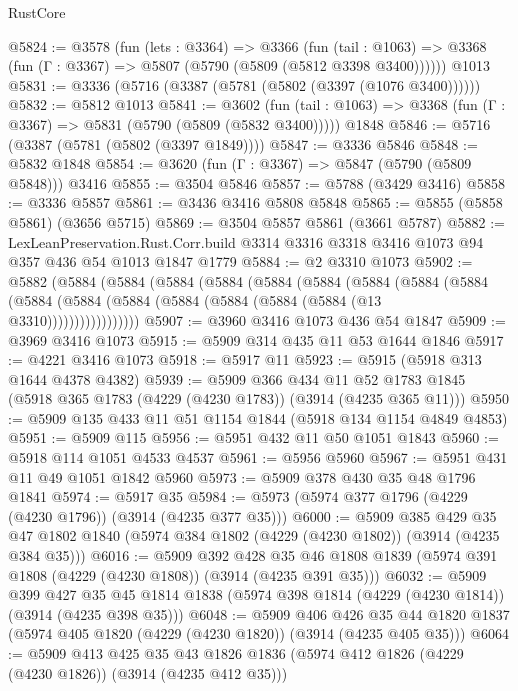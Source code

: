\begin{lexlean}{RustCore}
\begin{coremodule}
@5824 := @3578
    (fun (lets : @3364) =>
    @3366
      (fun (tail : @1063) => @3368 (fun (Γ : @3367) => @5807 (@5790 (@5809 (@5812 @3398 @3400))))))
    @1013
@5831 := @3336 (@5716 (@3387 (@5781 (@5802 (@3397 (@1076 @3400))))))
@5832 := @5812 @1013
@5841 := @3602
    (fun (tail : @1063) => @3368 (fun (Γ : @3367) => @5831 (@5790 (@5809 (@5832 @3400)))))
    @1848
@5846 := @5716 (@3387 (@5781 (@5802 (@3397 @1849))))
@5847 := @3336 @5846
@5848 := @5832 @1848
@5854 := @3620 (fun (Γ : @3367) => @5847 (@5790 (@5809 @5848))) @3416
@5855 := @3504 @5846
@5857 := @5788 (@3429 @3416)
@5858 := @3336 @5857
@5861 := @3436 @3416 @5808 @5848
@5865 := @5855 (@5858 @5861) (@3656 @5715)
@5869 := @3504 @5857 @5861 (@3661 @5787)
@5882 := LexLeanPreservation.Rust.Corr.build
    @3314
    @3316
    @3318
    @3416
    @1073
    @94
    @357
    @436
    @54
    @1013
    @1847
    @1779
@5884 := @2 @3310 @1073
@5902 := @5882
    (@5884
      (@5884
        (@5884
          (@5884
            (@5884
              (@5884
                (@5884
                  (@5884
                    (@5884
                      (@5884 (@5884 (@5884 (@5884 (@5884 (@5884 (@5884 (@13 @3310)))))))))))))))))
@5907 := @3960 @3416 @1073 @436 @54 @1847
@5909 := @3969 @3416 @1073
@5915 := @5909 @314 @435 @11 @53 @1644 @1846
@5917 := @4221 @3416 @1073
@5918 := @5917 @11
@5923 := @5915 (@5918 @313 @1644 @4378 @4382)
@5939 := @5909
    @366
    @434
    @11
    @52
    @1783
    @1845
    (@5918 @365 @1783 (@4229 (@4230 @1783)) (@3914 (@4235 @365 @11)))
@5950 := @5909 @135 @433 @11 @51 @1154 @1844 (@5918 @134 @1154 @4849 @4853)
@5951 := @5909 @115
@5956 := @5951 @432 @11 @50 @1051 @1843
@5960 := @5918 @114 @1051 @4533 @4537
@5961 := @5956 @5960
@5967 := @5951 @431 @11 @49 @1051 @1842 @5960
@5973 := @5909 @378 @430 @35 @48 @1796 @1841
@5974 := @5917 @35
@5984 := @5973 (@5974 @377 @1796 (@4229 (@4230 @1796)) (@3914 (@4235 @377 @35)))
@6000 := @5909
    @385
    @429
    @35
    @47
    @1802
    @1840
    (@5974 @384 @1802 (@4229 (@4230 @1802)) (@3914 (@4235 @384 @35)))
@6016 := @5909
    @392
    @428
    @35
    @46
    @1808
    @1839
    (@5974 @391 @1808 (@4229 (@4230 @1808)) (@3914 (@4235 @391 @35)))
@6032 := @5909
    @399
    @427
    @35
    @45
    @1814
    @1838
    (@5974 @398 @1814 (@4229 (@4230 @1814)) (@3914 (@4235 @398 @35)))
@6048 := @5909
    @406
    @426
    @35
    @44
    @1820
    @1837
    (@5974 @405 @1820 (@4229 (@4230 @1820)) (@3914 (@4235 @405 @35)))
@6064 := @5909
    @413
    @425
    @35
    @43
    @1826
    @1836
    (@5974 @412 @1826 (@4229 (@4230 @1826)) (@3914 (@4235 @412 @35)))

\end{coremodule}
\end{lexlean}
